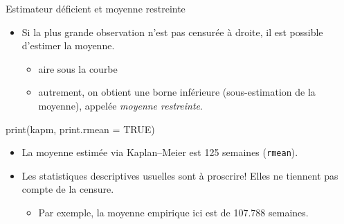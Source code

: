 \documentclass[
  ignorenonframetext,
]{beamer}
\newenvironment{Shaded}{\begin{snugshade}}{\end{snugshade}}
\newcommand{\AttributeTok}[1]{\textcolor[rgb]{0.40,0.45,0.13}{#1}}
\newcommand{\ConstantTok}[1]{\textcolor[rgb]{0.56,0.35,0.01}{#1}}
\newcommand{\FunctionTok}[1]{\textcolor[rgb]{0.28,0.35,0.67}{#1}}
\newcommand{\NormalTok}[1]{\textcolor[rgb]{0.00,0.23,0.31}{#1}}
\providecommand{\tightlist}{%
  \setlength{\itemsep}{0pt}\setlength{\parskip}{0pt}}\usepackage{longtable,booktabs,array}
\begin{document}
\begin{frame}[fragile]{Estimateur déficient et moyenne restreinte}
\protect\hypertarget{estimateur-duxe9ficient-et-moyenne-restreinte}{}
\begin{itemize}
\tightlist
\item
  Si la plus grande observation n'est pas censurée à droite, il est
  possible d'estimer la moyenne.

  \begin{itemize}
  \tightlist
  \item
    aire sous la courbe
  \item
    autrement, on obtient une borne inférieure (sous-estimation de la
    moyenne), appelée \emph{moyenne restreinte}.
  \end{itemize}
\end{itemize}

\begin{Shaded}
\begin{Highlighting}[numbers=left,,]
\FunctionTok{print}\NormalTok{(kapm, }\AttributeTok{print.rmean =} \ConstantTok{TRUE}\NormalTok{)}
\end{Highlighting}
\end{Shaded}

\begin{itemize}
\tightlist
\item
  La moyenne estimée via Kaplan--Meier est 125 semaines
  (\texttt{rmean}).\\
\item
  Les statistiques descriptives usuelles sont à proscrire! Elles ne
  tiennent pas compte de la censure.

  \begin{itemize}
  \tightlist
  \item
    Par exemple, la moyenne empirique ici est de 107.788 semaines.
  \end{itemize}
\end{itemize}
\end{frame}
\end{document}
